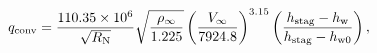 \documentclass[10pt]{article}
\begin{document}
\begin{align*}q_{\rm conv} = \frac{110.35\times10^6}{ \sqrt{R_{\rm N}} } \sqrt{ \frac{ \rho_{\infty} }{ 1.225 } } \left( \frac{ V_{\infty} }{ 7924.8 } \right)^{3.15} \left( \frac{ h_{\rm stag} - h_{\rm w} }{ h_{\rm stag} - h_{\rm w0}} \right) ,\end{align*}
\end{document}
